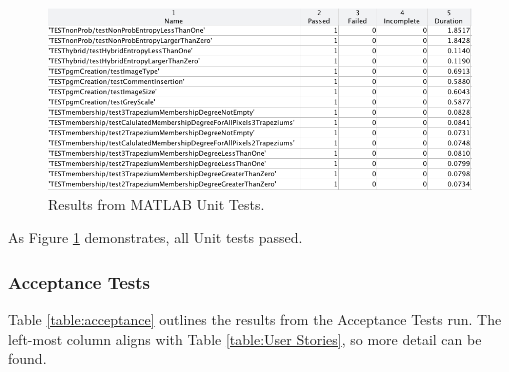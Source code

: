 \begin{figure}[H]
  \centering
  \includegraphics[width=\textwidth]{Chapter2/software-img/test-results.png}
  \caption{Results from MATLAB Unit Tests.}
  \label{fig:unit-test-results}
\end{figure}

As Figure \ref{fig:unit-test-results} demonstrates, all Unit tests passed.

\subsubsection{Acceptance Tests}

Table \ref{table:acceptance} outlines the results from the Acceptance Tests run. The left-most column  aligns with Table \ref{table:User Stories}, so more detail can be found.

